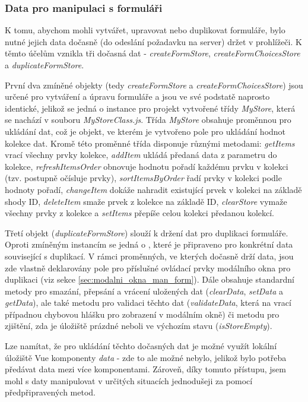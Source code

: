 		\subsubsection{Data pro manipulaci s formuláři}\label{sec:data_prohlizec_form}
		K tomu, abychom mohli vytvářet, upravovat nebo duplikovat formuláře, bylo nutné jejich data dočasně (do odeslání požadavku na server) držet v prohlížeči. K těmto účelům vznikla tři dočasná  dat - \textit{createFormStore}, \textit{createFormChoicesStore} a \textit{duplicateFormStore}.
		
		První dva zmíněné objekty (tedy \textit{createFormStore} a \textit{createFormChoicesStore}) jsou určené pro vytváření a úpravu formuláře a jsou ve své podstatě naprosto identické, jelikož se jedná o instance pro projekt vytvořené třídy \textit{MyStore}, která se nachází v souboru \textit{MyStoreClass.js}. Třída \textit{MyStore} obsahuje proměnnou pro ukládání dat, což je objekt, ve kterém je vytvořeno pole pro ukládání hodnot kolekce dat. Kromě této proměnné třída disponuje různými metodami: \textit{getItems} vrací všechny prvky kolekce, \textit{addItem} ukládá předaná data z parametru do kolekce, \textit{refreshItemsOrder} obnovuje hodnotu pořadí každému prvku v kolekci (tzv. postupně očísluje prvky), \textit{sortItemsByOrder} řadí prvky v kolekci podle hodnoty pořadí, \textit{changeItem} dokáže nahradit existující prvek v kolekci na základě shody ID, \textit{deleteItem} smaže prvek z kolekce na základě ID, \textit{clearStore} vymaže všechny prvky z kolekce a \textit{setItems} přepíše celou kolekci předanou kolekcí.
		
		Třetí objekt (\textit{duplicateFormStore}) slouží k držení dat pro duplikaci formuláře. Oproti zmíněným instancím se jedná o , které je připraveno pro konkrétní data související s duplikací. V rámci proměnných, ve kterých dočasně drží data, jsou zde vlastně deklarovány pole pro příslušné ovládací prvky modálního okna pro duplikaci (viz sekce \ref{sec:modalni_okna_man_form}). Dále obsahuje standardní metody pro smazání, přepsání a vrácení uložených dat (\textit{clearData}, \textit{setData} a \textit{getData}), ale také metodu pro validaci těchto dat (\textit{validateData}, která na vrací případnou chybovou hlášku pro zobrazení v modálním okně) či metodu pro zjištění, zda je úložiště prázdné neboli ve výchozím stavu (\textit{isStoreEmpty}).
		
		Lze namítat, že pro ukládání těchto dočasných dat je možné využít lokální úložiště Vue komponenty \textit{data} - zde to ale možné nebylo, jelikož bylo potřeba předávat data mezi více komponentami. Zároveň, díky tomuto přístupu, jsem mohl s daty manipulovat v určitých situacích jednodušeji za pomocí předpřipravených metod.
	
